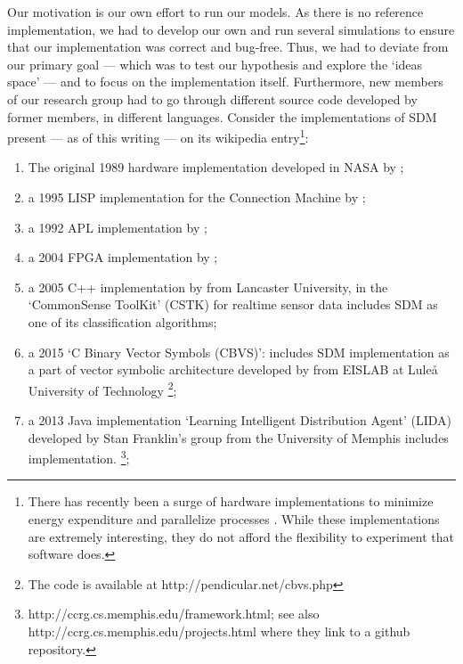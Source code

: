 Our motivation is our own effort to run our models. As there is no reference implementation, we had to develop our own and run several simulations to ensure that our implementation was correct and bug-free. Thus, we had to deviate from our primary goal --- which was to test our hypothesis and explore the `ideas space' --- and to focus on the implementation itself. Furthermore, new members of our research group had to go through different source code developed by former members, in different languages.  Consider the implementations of SDM present --- as of this writing --- on its wikipedia entry\citep{noauthor_sparse_2018}\footnote{There has recently been a surge of hardware implementations to minimize energy expenditure and parallelize processes \citep{kang_energy-efficient_2015, kang_-memory_2016, li_hyperdimensional_2016, montagna_pulp-hd:_2018, salahuddin_energy_nodate}.  While these implementations are extremely interesting, they do not afford the flexibility to experiment that software does.}:

\begin{enumerate}
    \item The original 1989 hardware implementation developed in NASA by \citet{flynn_sparse_1989};

    \item a 1995 LISP implementation for the Connection Machine by \citet{turk_kanervas_1995};

    \item a 1992 APL implementation by \citet{surkan_wsdm:_1992};

    \item a 2004 FPGA implementation by \citet{silva_reconfigurable_2004};

    \item a 2005 C++ implementation by \citet{berchtold_processing_2005} from Lancaster University, in the `CommonSense ToolKit' (CSTK) \citep{noauthor_cstk:_nodate} for realtime sensor data includes SDM as one of its classification algorithms;

    \item  a 2015 `C Binary Vector Symbols (CBVS)':  includes SDM implementation as a part of  vector symbolic architecture developed by \citet{emruli_vector_2015} from EISLAB at Luleå University of Technology \footnote{The code is available at http://pendicular.net/cbvs.php};

    \item a 2013 Java implementation `Learning Intelligent Distribution Agent' (LIDA) developed by \citep{franklin_lida:_2014, snaider_integer_2013, snaider_modular_2014} Stan Franklin's group from the University of Memphis includes implementation. \footnote{http://ccrg.cs.memphis.edu/framework.html; see also http://ccrg.cs.memphis.edu/projects.html where they link to a github repository.};

\end{enumerate}

